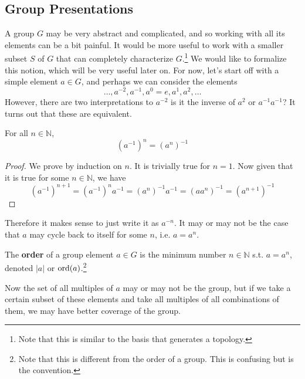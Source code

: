 \subsection{Group Presentations} 

  A group $G$ may be very abstract and complicated, and so working with all its elements can be a bit painful. It would be more useful to work with a smaller subset $S$ of $G$ that can completely characterize $G$.\footnote{Note that this is similar to the basis that generates a topology.} We would like to formalize this notion, which will be very useful later on. For now, let's start off with a simple element $a \in G$, and perhaps we can consider the elements 
  \begin{equation}
    \ldots, a^{-2}, a^{-1}, a^0 = e, a^1, a^2, \ldots
  \end{equation}
  However, there are two interpretations to $a^{-2}$ is it the inverse of $a^2$ or $a^{-1} a^{-1}$? It turns out that these are equivalent. 

  \begin{lemma}
    For all $n \in \mathbb{N}$, 
    \begin{equation}
      (a^{-1})^n = (a^n)^{-1}
    \end{equation}
  \end{lemma}
  \begin{proof}
    We prove by induction on $n$. It is trivially true for $n=1$. Now given that it is true for some $n \in \mathbb{N}$, we have 
    \begin{equation}
      (a^{-1})^{n+1} = (a^{-1})^n a^{-1} = (a^n)^{-1} a^{-1} = (a a^n)^{-1} = (a^{n+1})^{-1}
    \end{equation}
  \end{proof}

  Therefore it makes sense to just write it as $a^{-n}$. It may or may not be the case that $a$ may cycle back to itself for some $n$, i.e. $a = a^n$. 

  \begin{definition}
    The \textbf{order} of a group element $a \in G$ is the minimum number $n \in \mathbb{N}$ s.t. $a = a^n$, denoted $|a|$ or $\ord(a)$.\footnote{Note that this is different from the order of a group. This is confusing but is the convention. }
  \end{definition} 

  Now the set of all multiples of $a$ may or may not be the group, but if we take a certain subset of these elements and take all multiples of all combinations of them, we may have better coverage of the group. 

